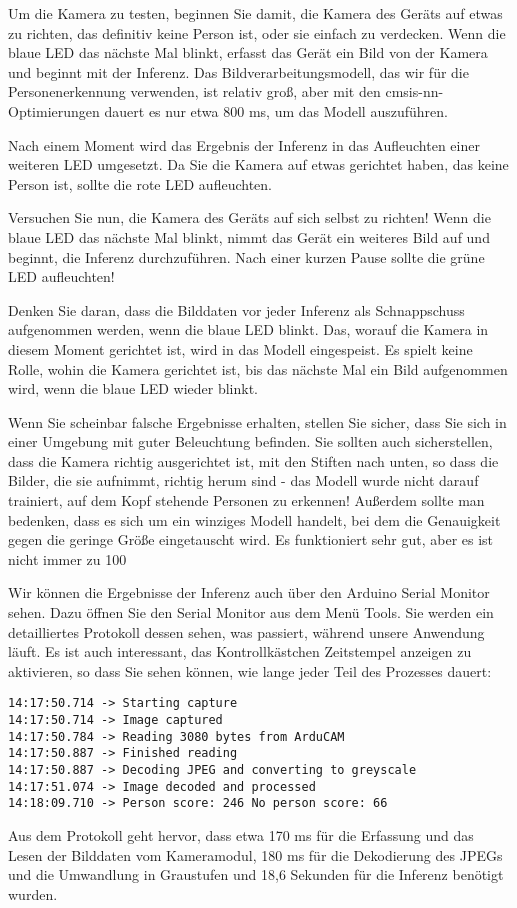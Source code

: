 Um die Kamera zu testen, beginnen Sie damit, die Kamera des Geräts auf etwas zu richten, das definitiv keine Person ist, oder sie einfach zu verdecken. Wenn die blaue LED das nächste Mal blinkt, erfasst das Gerät ein Bild von der Kamera und beginnt mit der Inferenz. Das Bildverarbeitungsmodell, das wir für die Personenerkennung verwenden, ist relativ groß, aber mit den cmsis-nn-Optimierungen dauert es nur etwa 800 ms, um das Modell auszuführen.

Nach einem Moment wird das Ergebnis der Inferenz in das Aufleuchten einer weiteren LED umgesetzt. Da Sie die Kamera auf etwas gerichtet haben, das keine Person ist, sollte die rote LED aufleuchten.

Versuchen Sie nun, die Kamera des Geräts auf sich selbst zu richten! Wenn die blaue LED das nächste Mal blinkt, nimmt das Gerät ein weiteres Bild auf und beginnt, die Inferenz durchzuführen. Nach einer kurzen Pause sollte die grüne LED aufleuchten!

Denken Sie daran, dass die Bilddaten vor jeder Inferenz als Schnappschuss aufgenommen werden, wenn die blaue LED blinkt. Das, worauf die Kamera in diesem Moment gerichtet ist, wird in das Modell eingespeist. Es spielt keine Rolle, wohin die Kamera gerichtet ist, bis das nächste Mal ein Bild aufgenommen wird, wenn die blaue LED wieder blinkt.

Wenn Sie scheinbar falsche Ergebnisse erhalten, stellen Sie sicher, dass Sie sich in einer Umgebung mit guter Beleuchtung befinden. Sie sollten auch sicherstellen, dass die Kamera richtig ausgerichtet ist, mit den Stiften nach unten, so dass die Bilder, die sie aufnimmt, richtig herum sind - das Modell wurde nicht darauf trainiert, auf dem Kopf stehende Personen zu erkennen! Außerdem sollte man bedenken, dass es sich um ein winziges Modell handelt, bei dem die Genauigkeit gegen die geringe Größe eingetauscht wird. Es funktioniert sehr gut, aber es ist nicht immer zu 100 %

Wir können die Ergebnisse der Inferenz auch über den Arduino Serial Monitor sehen. Dazu öffnen Sie den Serial Monitor aus dem Menü Tools. Sie werden ein detailliertes Protokoll dessen sehen, was passiert, während unsere Anwendung läuft. Es ist auch interessant, das Kontrollkästchen Zeitstempel anzeigen zu aktivieren, so dass Sie sehen können, wie lange jeder Teil des Prozesses dauert:



\begin{code}
    \begin{lstlisting}
14:17:50.714 -> Starting capture
14:17:50.714 -> Image captured
14:17:50.784 -> Reading 3080 bytes from ArduCAM
14:17:50.887 -> Finished reading
14:17:50.887 -> Decoding JPEG and converting to greyscale
14:17:51.074 -> Image decoded and processed
14:18:09.710 -> Person score: 246 No person score: 66
  \end{lstlisting}
\end{code}

Aus dem Protokoll geht hervor, dass etwa 170 ms für die Erfassung und das Lesen der Bilddaten vom Kameramodul, 180 ms für die Dekodierung des JPEGs und die Umwandlung in Graustufen und 18,6 Sekunden für die Inferenz benötigt wurden.

